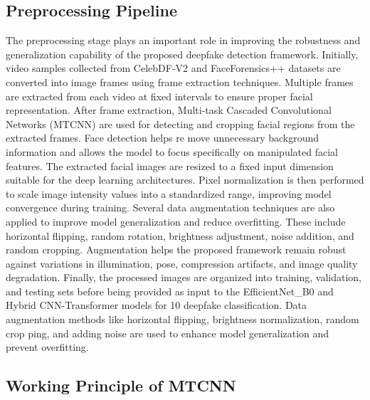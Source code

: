 \documentclass[12pt,a4paper]{report}
\begin{document}
\subsection{Preprocessing Pipeline}
The preprocessing stage plays an important role in improving the robustness and generalization capability of the proposed deepfake detection framework. Initially, video samples collected from CelebDF-V2 and FaceForensics++ datasets are converted into image frames using frame extraction techniques. Multiple frames are extracted from each video at fixed intervals to ensure proper facial representation. After frame extraction, Multi-task Cascaded Convolutional Networks (MTCNN) are used for detecting and cropping facial regions from the extracted frames. Face detection helps re move unnecessary background information and allows the model to focus specifically on manipulated facial features. The extracted facial images are resized to a fixed input dimension suitable for the deep learning architectures. Pixel normalization is then performed to scale image intensity values into a standardized range, improving model convergence during training. Several data augmentation techniques are also applied to improve model generalization and reduce overfitting. These include horizontal flipping, random rotation, brightness adjustment, noise addition, and random cropping. Augmentation helps the proposed framework remain robust against variations in illumination, pose, compression artifacts, and image quality degradation. Finally, the processed images are organized into training, validation, and testing sets before being provided as input to the EfficientNet\_B0 and Hybrid CNN-Transformer models for 10 deepfake classification. Data augmentation methods like horizontal flipping, brightness normalization, random crop ping, and adding noise are used to enhance model generalization and prevent overfitting.

\subsection{Working Principle of MTCNN}
\end{document}
